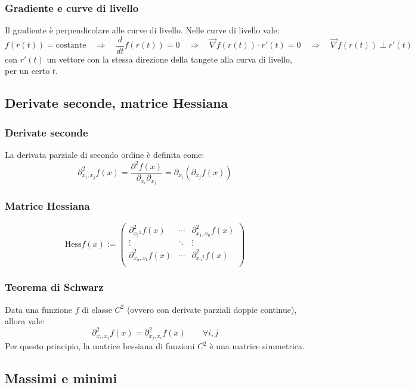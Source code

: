 \documentclass[a4paper]{article}
\newcommand\dt{\frac{d}{dt}}  %
\begin{document}
\subsubsection*{Gradiente e curve di livello}
Il gradiente è perpendicolare alle curve di livello. Nelle curve di livello vale:
\[f(r(t)) = \text{costante} \quad \Rightarrow \quad \dt f(r(t)) = 0 \quad \Rightarrow \quad \vec{\nabla} f(r(t)) \cdot r'(t) = 0 \quad \Rightarrow \quad \vec{\nabla} f(r(t)) \perp r'(t)\]
con \(r'(t)\) un vettore con la stessa direzione della tangete alla curva di livello, per un certo \(t\).

\newpage

\subsection{Derivate seconde, matrice Hessiana}
\subsubsection*{Derivate seconde}
La derivata parziale di secondo ordine è definita come:
\[\partial^2_{x_i,x_j} f(x) = \frac{\partial^2 f(x)}{\partial_{x_i} \partial_{x_j}} = \partial_{x_i} (\partial_{x_j} f(x))\]

\subsubsection*{Matrice Hessiana}
\[\text{Hess}f(x) := \left( \begin{matrix}
	\partial^2_{{x_1}^2} f(x) & \cdots & \partial^2_{{x_1,x_n}} f(x) \\
	\vdots & \ddots & \vdots \\
	\partial^2_{{x_n,x_1}} f(x) & \cdots & \partial^2_{{x_n}^2} f(x) \\
\end{matrix} \right) \]

\subsubsection*{Teorema di Schwarz}
Data una funzione \(f\) di classe \(C^2\) (ovvero con derivate parziali doppie continue), allora vale:
\[\partial^2_{x_i,x_j} f(x) = \partial^2_{x_j,x_i} f(x) \qquad \forall i,j\]
Per questo principio, la matrice hessiana di funzioni \(C^2\) è una matrice simmetrica.

\subsection{Massimi e minimi}
\end{document}
